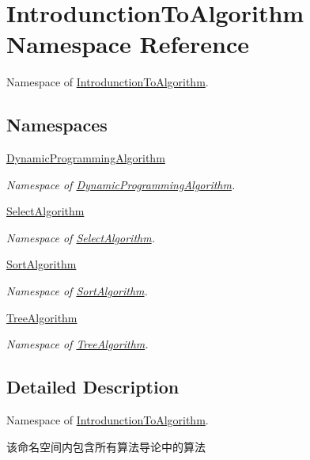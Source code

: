 \hypertarget{namespace_introdunction_to_algorithm}{}\section{Introdunction\+To\+Algorithm Namespace Reference}
\label{namespace_introdunction_to_algorithm}


Namespace of \hyperlink{namespace_introdunction_to_algorithm}{Introdunction\+To\+Algorithm}.  


\subsection*{Namespaces}
\begin{DoxyCompactItemize}
\item 
 \hyperlink{namespace_introdunction_to_algorithm_1_1_dynamic_programming_algorithm}{Dynamic\+Programming\+Algorithm}
\begin{DoxyCompactList}\small\item\em Namespace of \hyperlink{namespace_introdunction_to_algorithm_1_1_dynamic_programming_algorithm}{Dynamic\+Programming\+Algorithm}. \end{DoxyCompactList}\item 
 \hyperlink{namespace_introdunction_to_algorithm_1_1_select_algorithm}{Select\+Algorithm}
\begin{DoxyCompactList}\small\item\em Namespace of \hyperlink{namespace_introdunction_to_algorithm_1_1_select_algorithm}{Select\+Algorithm}. \end{DoxyCompactList}\item 
 \hyperlink{namespace_introdunction_to_algorithm_1_1_sort_algorithm}{Sort\+Algorithm}
\begin{DoxyCompactList}\small\item\em Namespace of \hyperlink{namespace_introdunction_to_algorithm_1_1_sort_algorithm}{Sort\+Algorithm}. \end{DoxyCompactList}\item 
 \hyperlink{namespace_introdunction_to_algorithm_1_1_tree_algorithm}{Tree\+Algorithm}
\begin{DoxyCompactList}\small\item\em Namespace of \hyperlink{namespace_introdunction_to_algorithm_1_1_tree_algorithm}{Tree\+Algorithm}. \end{DoxyCompactList}\end{DoxyCompactItemize}


\subsection{Detailed Description}
Namespace of \hyperlink{namespace_introdunction_to_algorithm}{Introdunction\+To\+Algorithm}. 

该命名空间内包含所有算法导论中的算法 